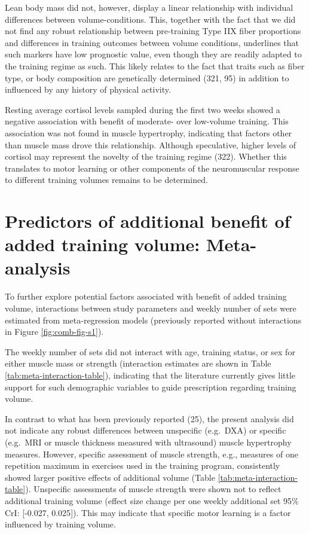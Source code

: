 \documentclass[twoside,10pt]{gihclass} %
\begin{document}
Lean body mass did not, however, display a linear relationship with individual differences between volume-conditions.
This, together with the fact that we did not find any robust relationship between pre-training Type IIX fiber proportions and differences in training outcomes between volume conditions, underlines that such markers have low prognostic value, even though they are readily adapted to the training regime as such.
This likely relates to the fact that traits such as fiber type, or body composition are genetically determined
(321, 95)
in addition to influenced by any history of physical activity.

Resting average cortisol levels sampled during the first two weeks showed a negative association with benefit of moderate- over low-volume training. This association was not found in muscle hypertrophy, indicating that factors other than muscle mass drove this relationship. Although speculative, higher levels of cortisol may represent the novelty of the training regime
(322).
Whether this translates to motor learning or other components of the neuromuscular response to different training volumes remains to be determined.

\hypertarget{predictors-of-additional-benefit-of-added-training-volume-meta-analysis}{%
\section{Predictors of additional benefit of added training volume: Meta-analysis}\label{predictors-of-additional-benefit-of-added-training-volume-meta-analysis}}

To further explore potential factors associated with benefit of added training volume, interactions between study parameters and weekly number of sets were estimated from meta-regression models (previously reported without interactions in Figure \ref{fig:comb-fig-s1}).

The weekly number of sets did not interact with age, training status, or sex for either muscle mass or strength (interaction estimates are shown in Table \ref{tab:meta-interaction-table}), indicating that the literature currently gives little support for such demographic variables to guide prescription regarding training volume.

In contrast to what has been previously reported
(25),
the present analysis did not indicate any robust differences between unspecific (e.g.~DXA) or specific (e.g.~MRI or muscle thickness measured with ultrasound) muscle hypertrophy measures.
However, specific assessment of muscle strength, e.g., measures of one repetition maximum in exercises used in the training program, consistently showed larger positive effects of additional volume (Table \ref{tab:meta-interaction-table}).
Unspecific assessments of muscle strength were shown not to reflect additional training volume (effect size change per one weekly additional set 95\% CrI: {[}-0.027, 0.025{]}). This may indicate that specific motor learning is a factor influenced by training volume.
\end{document}
